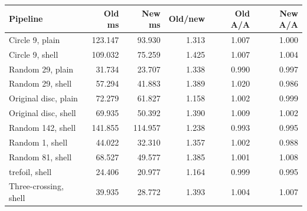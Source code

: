 \begin{tabular}{lrrrrr}
\toprule
Pipeline & Old ms & New ms & Old/new & Old A/A & New A/A \\
\midrule
Circle 9, plain & 123.147 & 93.930 & 1.313 & 1.007 & 1.000 \\
Circle 9, shell & 109.032 & 75.259 & 1.425 & 1.007 & 1.004 \\
Random 29, plain & 31.734 & 23.707 & 1.338 & 0.990 & 0.997 \\
Random 29, shell & 57.294 & 41.883 & 1.389 & 1.020 & 0.986 \\
Original disc, plain & 72.279 & 61.827 & 1.158 & 1.002 & 0.999 \\
Original disc, shell & 69.935 & 50.392 & 1.390 & 1.009 & 1.002 \\
Random 142, shell & 141.855 & 114.957 & 1.238 & 0.993 & 0.995 \\
Random 1, shell & 44.022 & 32.310 & 1.357 & 1.002 & 0.988 \\
Random 81, shell & 68.527 & 49.577 & 1.385 & 1.001 & 1.008 \\
trefoil, shell & 24.406 & 20.977 & 1.164 & 0.999 & 0.995 \\
Three-crossing, shell & 39.935 & 28.772 & 1.393 & 1.004 & 1.007 \\
\bottomrule
\end{tabular}
